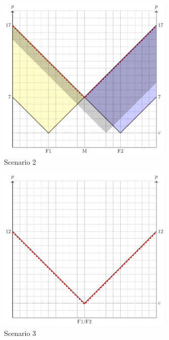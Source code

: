 \documentclass[
  12pt,
  oneside]{book}
\theoremstyle{definition}
\theoremstyle{definition}
\theoremstyle{definition}
\theoremstyle{definition}
\theoremstyle{remark}
\begin{document}
\begin{figure}
\centering
\includegraphics[width=0.75\textwidth,height=\textheight]{fig/lau2.png}
\caption{\label{fig:lau2} Scenario 2}
\end{figure}

\begin{figure}
\centering
\includegraphics[width=0.75\textwidth,height=\textheight]{fig/lau3.png}
\caption{\label{fig:lau3} Scenario 3}
\end{figure}
\end{document}

